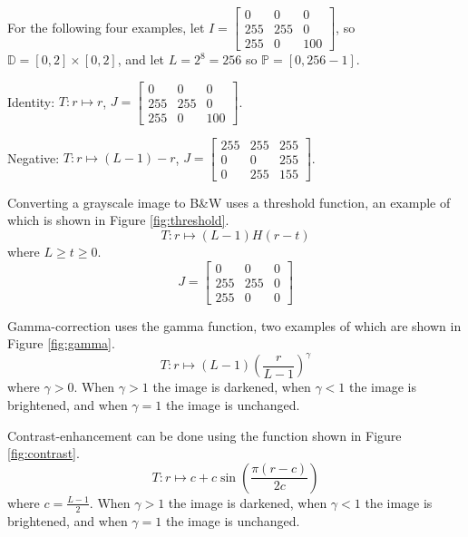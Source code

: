 \documentclass[12pt]{article}
\begin{document}
For the following four examples, let $I = \begin{bmatrix}
    0 & 0 & 0\\ 255 & 255 & 0 \\ 255 & 0 & 100
\end{bmatrix}$, so $\mathbb{D} = \left[0, 2\right] \times \left[0, 2\right]$, and let $L = 2^8 = 256$ so $\mathbb{P} = \left[0, 256 - 1\right]$.

\begin{exmp}
    Identity: $T: r \mapsto r$, $J = \begin{bmatrix}
        0 & 0 & 0\\ 255 & 255 & 0 \\ 255 & 0 & 100
    \end{bmatrix}$.
\end{exmp}

\begin{exmp}
    Negative: $T: r \mapsto (L-1) - r$, $J = \begin{bmatrix}
        255 & 255 & 255 \\ 0 & 0 & 255 \\ 0 & 255 & 155
    \end{bmatrix}$.
\end{exmp}

\begin{exmp}
    Converting a grayscale image to B\&W uses a threshold function, an example of which is shown in Figure \ref{fig:threshold}. \[T: r \mapsto (L-1)H(r - t)\] where $L \geq t \geq 0$. \[J = \begin{bmatrix}
        0 & 0 & 0\\ 255 & 255 & 0 \\ 255 & 0 & 0
    \end{bmatrix}\]
\end{exmp}

\begin{exmp}
    Gamma-correction uses the gamma function, two examples of which are shown in Figure \ref{fig:gamma}. \[T: r \mapsto (L-1)\left(\frac{r}{L-1}\right)^\gamma\] where $\gamma > 0$. When $\gamma > 1$ the image is darkened, when $\gamma < 1$ the image is brightened, and when $\gamma = 1$ the image is unchanged.
\end{exmp}

\begin{exmp}
    Contrast-enhancement can be done using the function shown in Figure \ref{fig:contrast}. \[T: r \mapsto c + c\sin\left(\frac{\pi(r-c)}{2c}\right)\] where $c = \frac{L - 1}{2}$. When $\gamma > 1$ the image is darkened, when $\gamma < 1$ the image is brightened, and when $\gamma = 1$ the image is unchanged.
\end{exmp}
\end{document}
